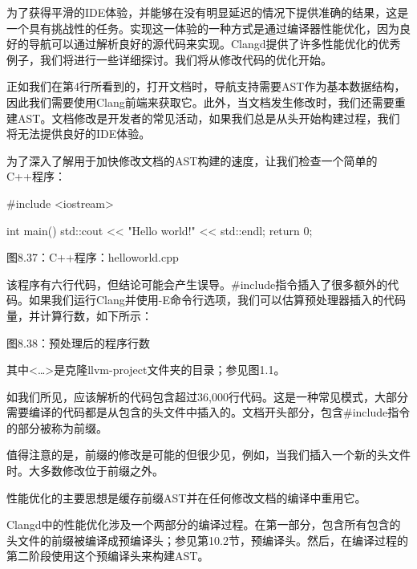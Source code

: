 为了获得平滑的IDE体验，并能够在没有明显延迟的情况下提供准确的结果，这是一个具有挑战性的任务。实现这一体验的一种方式是通过编译器性能优化，因为良好的导航可以通过解析良好的源代码来实现。Clangd提供了许多性能优化的优秀例子，我们将进行一些详细探讨。我们将从修改代码的优化开始。


正如我们在第4行所看到的，打开文档时，导航支持需要AST作为基本数据结构，因此我们需要使用Clang前端来获取它。此外，当文档发生修改时，我们还需要重建AST。文档修改是开发者的常见活动，如果我们总是从头开始构建过程，我们将无法提供良好的IDE体验。


为了深入了解用于加快修改文档的AST构建的速度，让我们检查一个简单的C++程序：

\begin{cpp}
#include <iostream>

int main() {
  std::cout << "Hello world!" << std::endl;
  return 0;
}
\end{cpp}

\begin{center}
图8.37：C++程序：helloworld.cpp
\end{center}

该程序有六行代码，但结论可能会产生误导。\#include指令插入了很多额外的代码。如果我们运行Clang并使用-E命令行选项，我们可以估算预处理器插入的代码量，并计算行数，如下所示：


\begin{center}
图8.38：预处理后的程序行数
\end{center}

其中<…>是克隆llvm-project文件夹的目录；参见图1.1。

如我们所见，应该解析的代码包含超过36,000行代码。这是一种常见模式，大部分需要编译的代码都是从包含的头文件中插入的。文档开头部分，包含\#include指令的部分被称为前缀。

值得注意的是，前缀的修改是可能的但很少见，例如，当我们插入一个新的头文件时。大多数修改位于前缀之外。

性能优化的主要思想是缓存前缀AST并在任何修改文档的编译中重用它。


Clangd中的性能优化涉及一个两部分的编译过程。在第一部分，包含所有包含的头文件的前缀被编译成预编译头；参见第10.2节，预编译头。然后，在编译过程的第二阶段使用这个预编译头来构建AST。

